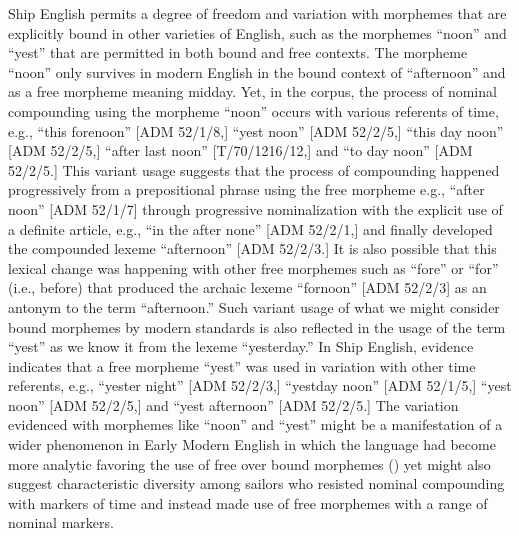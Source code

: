  Ship English permits a degree of freedom and variation with morphemes that are explicitly bound in other varieties of English, such as the morphemes “noon” and “yest” that are permitted in both bound and free contexts. The morpheme “noon” only survives in modern English in the bound context of “afternoon” and as a free morpheme meaning midday. Yet, in the corpus, the process of nominal compounding using the morpheme “noon” occurs with various referents of time, e.g., “this forenoon” [ADM 52/1/8,] “yest noon” [ADM 52/2/5,] “this day noon” [ADM 52/2/5,] “after last noon” [T/70/1216/12,] and “to day noon” [ADM 52/2/5.] This variant usage suggests that the process of compounding happened progressively from a prepositional phrase using the free morpheme e.g., “after noon” [ADM 52/1/7] through progressive nominalization with the explicit use of a definite article, e.g., “in the after none” [ADM 52/2/1,] and finally developed the compounded lexeme “afternoon” [ADM 52/2/3.] It is also possible that this lexical change was happening with other free morphemes such as “fore” or “for” (i.e., before) that produced the archaic lexeme “fornoon” [ADM 52/2/3] as an antonym to the term “afternoon.” Such variant usage of what we might consider bound morphemes by modern standards is also reflected in the usage of the term “yest” as we know it from the lexeme “yesterday.”  In Ship English, evidence indicates that a free morpheme “yest” was used in variation with other time referents, e.g., “yester night” [ADM 52/2/3,] “yestday noon” [ADM 52/1/5,] “yest noon” [ADM 52/2/5,] and “yest afternoon” [ADM 52/2/5.] The variation evidenced with morphemes like “noon” and “yest” might be a manifestation of a wider phenomenon in Early Modern English in which the language had become more analytic favoring the use of free over bound morphemes (\citealt{MillwardHayes2012}) yet might also suggest characteristic diversity among sailors who resisted nominal compounding with markers of time and instead made use of free morphemes with a range of nominal markers.  

